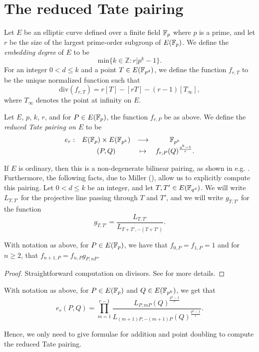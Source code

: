 \section{The reduced Tate pairing}

Let $E$ be an elliptic curve defined over a finite field $\mathbb{F}_{p}$ where $p$ is a prime, and let $r$ be the size of the largest prime-order subgroup of $E(\mathbb{F}_{p})$. We define the \emph{embedding degree} of $E$ to be
\[\text{min}\{k \in \mathbb{Z}: r|p^{k}-1\}.\]
For an integer $0<d\leq k$ and a point $T \in E(\mathbb{F}_{p^{d}})$, we define the function $f_{r,T}$ to be the unique normalized function such that
\[\text{div}(f_{r,T}) = r[T]-[rT]-(r-1)[T_{\infty}],\] where $T_{\infty}$ denotes the point at infinity on $E$.
\begin{definition}
Let $E$, $p$, $k$, $r$, and for $P \in E(\mathbb{F}_{p})$, the function $f_{r,P}$ be as above. We define the \emph{reduced Tate pairing on $E$} to be
\[\begin{array}{rccc}
e_{r}:& E(\mathbb{F}_{p})\times E(\mathbb{F}_{p^{k}}) & \longrightarrow & \mathbb{F}_{p^{k}} \\
& (P,Q) & \mapsto & f_{r,P}(Q)^{\frac{q^{k}-1}{r}}.
\end{array}\]
\end{definition} 
If $E$ is ordinary, then this is a non-degenerate bilinear pairing, as shown in e.g. \cite{Hess}. Furthermore, the following facts, due to Miller (\cite{Mil}), allow us to explicitly compute this pairing. Let $0<d \leq k$ be an integer, and let $T,T' \in E(\mathbb{F}_{q^{d}})$. We will write $L_{T,T'}$ for the projective line passing through $T$ and $T'$, and we will write $g_{T,T'}$ for the function
\[g_{T,T'}= \frac{L_{T,T'}}{L_{T+T',-(T+T')}}.\]

\begin{lemma}
With notation as above, for $P\in E(\mathbb{F}_{p})$, we have that $f_{0,P} = f_{1,P}=1$ and for $n \geq 2$, that $f_{n+1,P} = f_{n,P}g_{P,nP}$.
\end{lemma}

\begin{proof}
Straightforward computation on divisors. See \cite{Mil} for more details.
\end{proof}

\begin{corollary}
With notation as above, for $P \in E(\mathbb{F}_{p})$ and $Q \in E(\mathbb{F}_{p^{k}})$, we get that
\[e_{r}(P,Q)= \prod_{m=1}^{r-1} \frac{L_{P,mP}(Q)^{\frac{p^{k}-1}{r}}}{L_{(m+1)P,-(m+1)P}(Q)^{\frac{p^{k}-1}{r}}}.\]
\end{corollary}

Hence, we only need to give formulae for addition and point doubling to compute the reduced Tate pairing.
